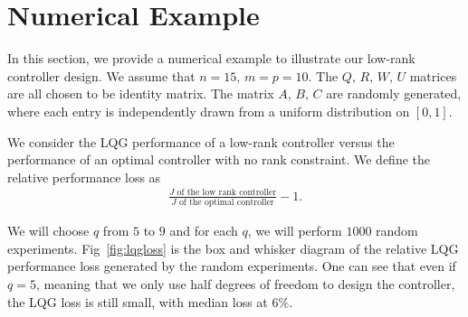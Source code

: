 \section{Numerical Example}
\label{sec:simulation}
In this section, we provide a numerical example to illustrate our low-rank controller design. We assume that $n = 15,\,m = p =10$. The $Q,\,R,\,W,\,U$ matrices are all chosen to be identity matrix. The matrix $A,\,B,\,C$ are randomly generated, where each entry is independently drawn from a uniform distribution on $[0,1]$.

We consider the LQG performance of a low-rank controller versus the performance of an optimal controller with no rank constraint. We define the relative performance loss as
\begin{align*}
  \frac{J\text{ of the low rank controller}}{J\text{ of the optimal controller}} - 1.
\end{align*}

We will choose $q$ from $5$ to $9$ and for each $q$, we will perform $1000$ random experiments. Fig~\ref{fig:lqgloss} is the box and whisker diagram of the relative LQG performance loss generated by the random experiments.
One can see that even if $q = 5$, meaning that we only use half degrees of freedom to design the controller, the LQG loss is still small, with median loss at $6\%$.
